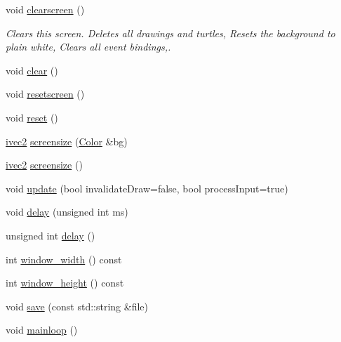 \begin{DoxyCompactItemize}
\item 
\mbox{\label{classcturtle_1_1InteractiveTurtleScreen_ae4e184867d7ed83c58e0ef9e730f4d73}} 
void \hyperlink{classcturtle_1_1InteractiveTurtleScreen_ae4e184867d7ed83c58e0ef9e730f4d73}{clearscreen} ()
\begin{DoxyCompactList}\small\item\em Clears this screen. Deletes all drawings and turtles, Resets the background to plain white, Clears all event bindings,. \end{DoxyCompactList}\item 
void \hyperlink{classcturtle_1_1InteractiveTurtleScreen_a60eecd547f88d1e52b1d0917693bffb8}{clear} ()
\item 
void \hyperlink{classcturtle_1_1InteractiveTurtleScreen_a06471bf6c8c02768fb0acd89649c72c2}{resetscreen} ()
\item 
void \hyperlink{classcturtle_1_1InteractiveTurtleScreen_a2863ede773ae592ad119b317b3704ce8}{reset} ()
\item 
\hyperlink{structcturtle_1_1ivec2}{ivec2} \hyperlink{classcturtle_1_1InteractiveTurtleScreen_a005b25693386718a6d80feeac677d255}{screensize} (\hyperlink{classcturtle_1_1Color}{Color} \&bg)
\item 
\hyperlink{structcturtle_1_1ivec2}{ivec2} \hyperlink{classcturtle_1_1InteractiveTurtleScreen_a1263d763eb9ef1b39f2e8c0a445d6a85}{screensize} ()
\item 
void \hyperlink{classcturtle_1_1InteractiveTurtleScreen_adfefb43645347feb832072f8fc8da144}{update} (bool invalidate\+Draw=false, bool process\+Input=true)
\item 
void \hyperlink{classcturtle_1_1InteractiveTurtleScreen_a6e32b852cbd029d6649107d838c798a9}{delay} (unsigned int ms)
\item 
unsigned int \hyperlink{classcturtle_1_1InteractiveTurtleScreen_a2776d2a194e14b7adbc94ce502ee9409}{delay} ()
\item 
int \hyperlink{classcturtle_1_1InteractiveTurtleScreen_aefeb4e90fae07d043677f3dee9a29026}{window\+\_\+width} () const
\item 
int \hyperlink{classcturtle_1_1InteractiveTurtleScreen_a259883332b284e3b8a97b5bfb74f988d}{window\+\_\+height} () const
\item 
void \hyperlink{classcturtle_1_1InteractiveTurtleScreen_ab0ded9c577f523ca45240e036318553e}{save} (const std\+::string \&file)
\item 
void \hyperlink{classcturtle_1_1InteractiveTurtleScreen_a0b6a0f18333312f7d502b3d9a511143e}{mainloop} ()

\end{DoxyCompactItemize}
